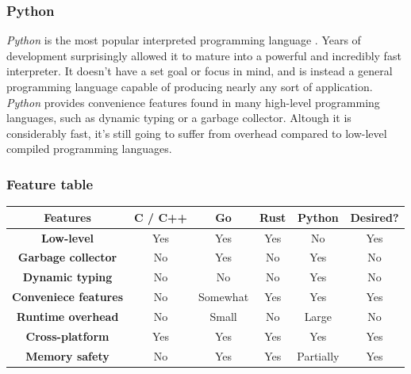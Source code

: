 \documentclass[12pt,a4paper,table]{article}
\begin{document}
            \subsubsection{Python}
                \textit{Python} is the most popular interpreted programming language \citep{tiobe}. Years of development surprisingly allowed it to mature into a powerful and incredibly fast interpreter. It doesn't have a set goal or focus in mind, and is instead a general programming language capable of producing nearly any sort of application. \textit{Python} provides convenience features found in many high-level programming languages, such as dynamic typing or a garbage collector. Altough it is considerably fast, it's still going to suffer from overhead compared to low-level compiled programming languages.

            \subsubsection{Feature table}
                \begin{center}
                    \begin{tabular}{ |c|c|c|c|c|c| }
                        \hline
                            Features & \textbf{C / C++} & \textbf{Go} & \textbf{Rust} & \textbf{Python} & \textbf{Desired?}\\
                            \hline
                            \textbf{Low-level} & Yes & Yes & Yes & No & Yes\\
                            \hline
                            \textbf{Garbage collector} & No & Yes & No & Yes & No\\
                            \hline
                            \textbf{Dynamic typing} & No & No & No & Yes & No\\
                            \hline
                            \textbf{Conveniece features} & No & Somewhat & Yes & Yes & Yes\\
                            \hline
                            \textbf{Runtime overhead} & No & Small & No & Large & No\\
                            \hline
                            \textbf{Cross-platform} & Yes & Yes & Yes & Yes & Yes\\
                            \hline
                            \textbf{Memory safety} & No & Yes & Yes & Partially & Yes\\
                        \hline
                    \end{tabular}
                \end{center}
\end{document}

